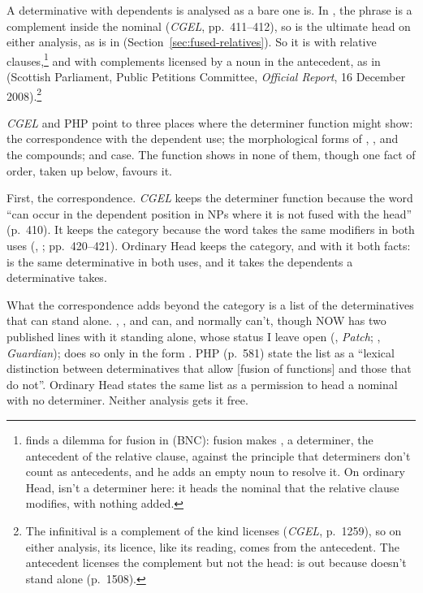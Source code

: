A determinative with dependents is analysed as a bare one is. In , the  phrase is a complement inside the nominal (\textit{CGEL}, pp.~411--412), so  is the ultimate head on either analysis, as  is in  (Section~\ref{sec:fused-relatives}). So it is with relative clauses,\footnote{\textcite[184--185]{wu2021exocentric} finds a dilemma for fusion in  (BNC): fusion makes , a determiner, the antecedent of the relative clause, against the principle that determiners don't count as antecedents, and he adds an empty noun to resolve it. On ordinary Head,  isn't a determiner here: it heads the nominal that the relative clause modifies, with nothing added.} and with complements licensed by a noun in the antecedent, as in  (Scottish Parliament, Public Petitions Committee, \textit{Official Report}, 16 December 2008).\footnote{The infinitival is a complement of the kind  licenses (\textit{CGEL}, p.~1259), so on either analysis, its licence, like its reading, comes from the antecedent. The antecedent licenses the complement but not the head:  is out because  doesn't stand alone (p.~1508).}

\textit{CGEL} and PHP point to three places where the determiner function might show: the correspondence with the dependent use; the morphological forms of , , and the compounds; and case. The function shows in none of them, though one fact of order, taken up below, favours it.

First, the correspondence. \textit{CGEL} keeps the determiner function because the word \enquote{can occur in the dependent position in NPs where it is not fused with the head} (p.~410). It keeps the category because the word takes the same modifiers in both uses (, ; pp.~420--421). Ordinary Head keeps the category, and with it both facts:  is the same determinative in both uses, and it takes the dependents a determinative takes.

What the correspondence adds beyond the category is a list of the determinatives that can stand alone. , , and  can, and  normally can't, though NOW has two published lines with it standing alone, whose status I leave open (, \textit{Patch}; , \textit{Guardian});  does so only in the form . PHP (p.~581) state the list as a \enquote{lexical distinction between determinatives that allow [fusion of functions] and those that do not}. Ordinary Head states the same list as a permission to head a nominal with no determiner. Neither analysis gets it free.

